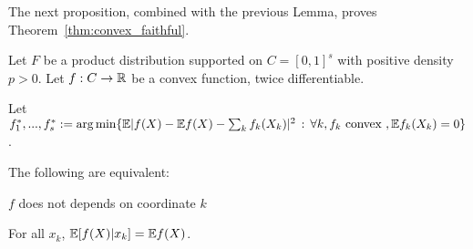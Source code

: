  The next proposition, combined with the previous Lemma, proves Theorem~\ref{thm:convex_faithful}.
 
 \begin{proposition}
Let $F$ be a product distribution supported on $C=[0,1]^s$ with positive density $p > 0$. Let $f: C \rightarrow {\mathbb R}$ be a convex function, twice differentiable. 

Let $f^*_1,...,f^*_s := \arg\min \{ {\mathbb E} | f(X) -{\mathbb E} f(X) - \sum_k f_k(X_k) |^2 \,:\, \forall k, f_k \textrm{ convex }, {\mathbb E} f_k(X_k) = 0\}$.

The following are equivalent:
\begin{packed_enum}
\item $f$ does not depends on coordinate $k$
\item For all $x_k$, ${\mathbb E}[ f(X) | x_k] = {\mathbb E} f(X) $.
\end{packed_enum}
\end{proposition}

